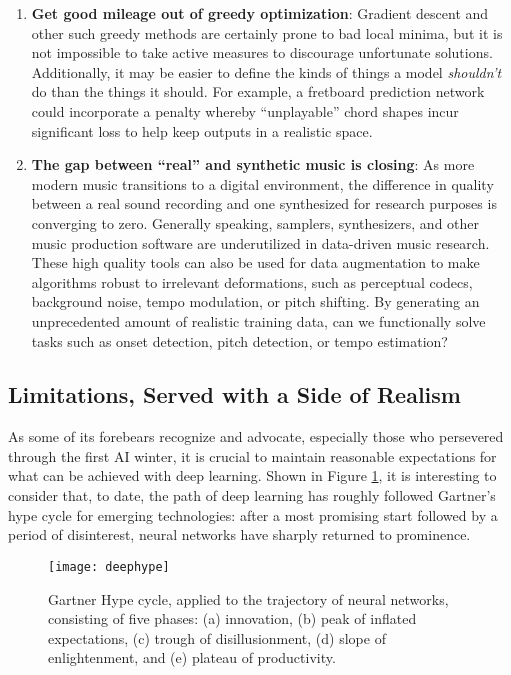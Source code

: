 \begin{enumerate}
\item \textbf{Get good mileage out of greedy optimization}:
Gradient descent and other such greedy methods are certainly prone to bad local minima, but it is not impossible to take active measures to discourage unfortunate solutions.
Additionally, it may be easier to define the kinds of things a model \emph{shouldn't} do than the things it should.
For example, a fretboard prediction network could incorporate a penalty whereby ``unplayable'' chord shapes incur significant loss to help keep outputs in a realistic space.


\item \textbf{The gap between ``real'' and synthetic music is closing}:
As more modern music transitions to a digital environment, the difference in quality between a real sound recording and one synthesized for research purposes is converging to zero.
Generally speaking, samplers, synthesizers, and other music production software are underutilized in data-driven music research.
These high quality tools can also be used for data augmentation to make algorithms robust to irrelevant deformations, such as perceptual codecs, background noise, tempo modulation, or pitch shifting.
By generating an unprecedented amount of realistic training data, can we functionally solve tasks such as onset detection, pitch detection, or tempo estimation?

\end{enumerate}


\subsection{Limitations, Served with a Side of Realism}

As some of its forebears recognize and advocate, especially those who persevered through the first AI winter, it is crucial to maintain reasonable expectations for what can be achieved with deep learning.
Shown in Figure \ref{fig:deephype}, it is interesting to consider that, to date, the path of deep learning has roughly followed Gartner's hype cycle for emerging technologies:
after a most promising start followed by a period of disinterest, neural networks have sharply returned to prominence.

\begin{figure}
\begin{centering}
\texttt{[image: deephype]}
\caption{Gartner Hype cycle, applied to the trajectory of neural networks, consisting of five phases: (a) innovation, (b) peak of inflated expectations, (c) trough of disillusionment, (d) slope of enlightenment, and (e) plateau of productivity.}
\label{fig:deephype}
\end{centering}
\end{figure}


